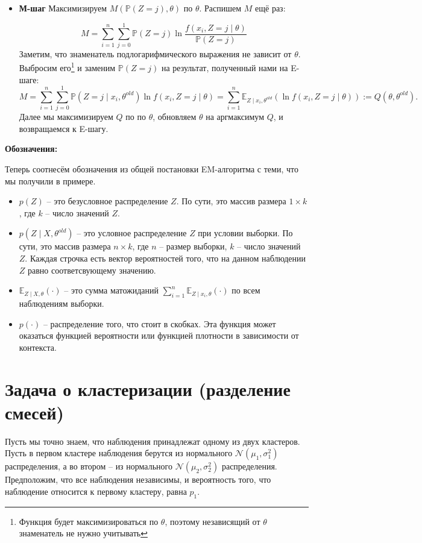 \documentclass[12pt,letterpaper]{article}
\begin{document}
{\begin{itemize}
        $$ \mathbb{P}(Z = j) := \mathbb{P}(Z = j \mid x_i, \theta^{old}).$$
        \item \textbf{М-шаг}
        Максимизируем $M(\mathbb{P}(Z = j), \theta)$ по $\theta$. Распишем $M$ ещё раз:
    
        $$M = \sum\limits_{i=1}^{n} \sum\limits_{j=0}^{1} \mathbb{P}(Z = j) \ln \dfrac{f(x_i, Z = j \mid \theta)}{\mathbb{P}(Z = j)}$$
        Заметим, что знаменатель подлогарифмического выражения не зависит от $\theta$. Выбросим его\footnote{Функция будет максимизироваться по $\theta$, поэтому независящий от $\theta$ знаменатель не нужно учитывать} и заменим $\mathbb{P}(Z = j)$ на результат, полученный нами на E-шаге:
        $$
        M = \sum\limits_{i=1}^{n} \sum\limits_{j=0}^{1} \mathbb{P}(Z = j \mid x_i, \theta^{old}) \ln f(x_i, Z = j \mid \theta) = \sum\limits_{i=1}^{n} \mathbb{E}_{Z \mid x_i, \theta^{old}}(\ln f(x_i, Z = j \mid \theta)) := Q(\theta, \theta^{old}).
        $$
        Далее мы максимизируем $Q$ по по $\theta$, обновляем $\theta$ на аргмаксимум $Q$, и возвращаемся к E-шагу.
    \end{itemize}
}
\textbf{Обозначения:}\\
{
    Теперь соотнесём обозначения из общей постановки EM-алгоритма с теми, что мы получили в примере.
    \begin{itemize}
        \item $p(Z)$ -- это безусловное распределение $Z$. По сути, это массив размера $1\times k$, где $k$ -- число значений $Z$.
        \item $p(Z \mid X, \theta^{old})$ -- это условное распределение $Z$ при условии выборки. По сути, это массив размера $n\times k$, где $n$ -- размер выборки, $k$ -- число значений $Z$. Каждая строчка есть вектор вероятностей того, что на данном наблюдении $Z$ равно соответсвующему значению.
        \item $\mathbb{E}_{Z \mid X, \theta}(\cdot)$ -- это сумма матожиданий $\sum\limits_{i=1}^{n} \mathbb{E}_{Z \mid x_i, \theta}(\cdot)$ по всем наблюдениям выборки.
        \item $p(\cdot)$ -- распределение того, что стоит в скобках. Эта функция может оказаться функцией вероятности или функцией плотности в зависимости от контекста.
    \end{itemize}
}
\section*{Задача о кластеризации (разделение смесей)}
{
    Пусть мы точно знаем, что наблюдения принадлежат одному из двух кластеров. Пусть в первом кластере наблюдения берутся из нормального $\mathcal{N}(\mu_1, \sigma_1^2)$ распределения, а во втором -- из нормального $\mathcal{N}(\mu_2, \sigma_2^2)$ распределения. Предположим, что все наблюдения независимы, и вероятность того, что наблюдение относится к первому кластеру, равна $p_1$.
}
\end{document}
